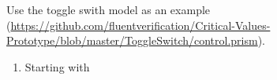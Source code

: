 
Use the toggle swith model as an example
(\url{https://github.com/fluentverification/Critical-Values-Prototype/blob/master/ToggleSwitch/control.prism}). 
\begin{enumerate}
	\item Starting with 
	
\end{enumerate}  



